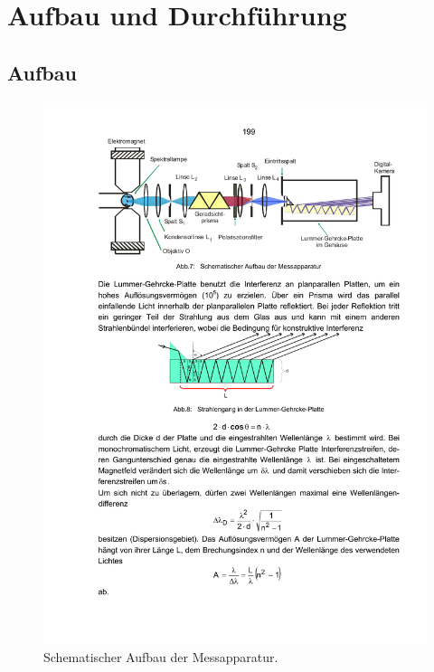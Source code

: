 \section{Aufbau und Durchführung}
\label{sec:Durchführung}

\subsection{Aufbau}
\begin{figure}
    \centering
    \includegraphics[width=\textwidth]{graphics/messapparatur.pdf}
    \caption{Schematischer Aufbau der Messapparatur. \cite[2]{Anleitung1}}
    \label{fig:messapparatur}
\end{figure}

